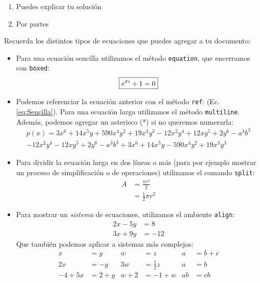 \documentclass{assignment}
\begin{document}
\begin{problem}
\begin{enumerate}
    \item Puedes explicar tu solución

    \item Por partes
\end{enumerate}

\noindent Recuerda los distintos tipos de ecuaciones que puedes agregar a tu documento:

\begin{itemize}
    \item Para una ecuación sencilla utilizamos el método \texttt{equation}, que encerramos con \texttt{boxed}:
    \begin{equation}\label{eq:Sencilla}
        \boxed{             %
        e^{\pi i} + 1 = 0
        }
    \end{equation}

    \item Podemos referenciar la ecuación anterior con el método \texttt{ref}: (Ec. \ref{eq:Sencilla}). Para una ecuación larga utilizamos el método \texttt{multiline}. Además, podemos agregar un asterisco (*) si no queremos numerarla:
    \begin{multline*}
        p(x) = 3x^6 + 14x^5y + 590x^4y^2 + 19x^3y^3 - 12x^2y^4 + 12xy^5 + 2y^6 - a^3b^3\\ 
            - 12x^2y^4 - 12xy^5 + 2y^6 - a^3b^3 + 3x^6 + 14x^5y - 590x^4y^2 + 19x^3y^3
    \end{multline*}

    \item Para dividir la ecuación larga en dos líneas o más (para por ejemplo mostrar un proceso de simplificación o de operaciones) utilizamos el comando \texttt{split}:
    \begin{equation} \label{eq1}
        \begin{split}
            A & = \frac{\pi r^2}{2} \\
             & = \frac{1}{2} \pi r^2
        \end{split}
    \end{equation}

    \item Para mostrar un \textit{sistema} de ecuaciones, utilizamos el ambiente \texttt{align}: 
    \begin{align*} 
        2x - 5y &=  8 \\ 
        3x + 9y &=  -12
    \end{align*}
    Que también podemos aplicar a sistemas más complejos:
    \begin{align*}
        x&=y           &  w &=z              &  a&=b+c\\
        2x&=-y         &  3w&=\frac{1}{2}z   &  a&=b\\
        -4 + 5x&=2+y   &  w+2&=-1+w          &  ab&=cb
    \end{align*}    


\end{itemize}
\end{problem}
\end{document}
